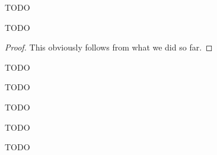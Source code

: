 %
\begin{definition}
  \label{def:Elligator1.c}
  \leanok
  TODO
\end{definition}

\begin{theorem}[c Property]
  \label{thm:Elligator1.c_h}
  \leanok
  TODO
\end{theorem}

\begin{proof}
  \leanok
  This obviously follows from what we did so far.
\end{proof}

\begin{definition}
  \label{def:Elligator1.r}
  \leanok
  TODO
\end{definition}

\begin{definition}
  \label{def:Elligator1.d}
  \leanok
  TODO
\end{definition}

\begin{definition}
  \label{def:Elligator1.u}
  \leanok
  TODO
\end{definition}

\begin{definition}
  \label{def:Elligator1.v}
  \leanok
  TODO
\end{definition}

\begin{definition}
  \label{def:LegendreSymbol.χ}
  \leanok
  TODO
\end{definition}

